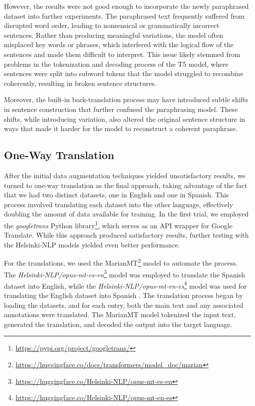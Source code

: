 \documentclass{Configuration_Files/PoliMi3i_thesis}
\begin{document}
However, the results were not good enough to incorporate the newly paraphrased dataset into further experiments. The paraphrased text frequently suffered from disrupted word order, leading to nonsensical or grammatically incorrect sentences. Rather than producing meaningful variations, the model often misplaced key words or phrases, which interfered with the logical flow of the sentences and made them difficult to interpret. This issue likely stemmed from problems in the tokenization and decoding process of the T5 model, where sentences were split into subword tokens that the model struggled to recombine coherently, resulting in broken sentence structures.

Moreover, the built-in back-translation process may have introduced subtle shifts in sentence construction that further confused the paraphrasing model. These shifts, while introducing variation, also altered the original sentence structure in ways that made it harder for the model to reconstruct a coherent paraphrase.

\subsection{One-Way Translation} \label{subsec:translation_T1}
After the initial data augmentation techniques yielded unsatisfactory results, we turned to one-way translation as the final approach, taking advantage of the fact that we had two distinct datasets, one in English and one in Spanish. This process involved translating each dataset into the other language, effectively doubling the amount of data available for training. In the first trial, we employed the \textit{googletrans} Python library\footnote{\url{https://pypi.org/project/googletrans/}}, which serves as an API wrapper for Google Translate. While this approach produced satisfactory results, further testing with the Helsinki-NLP models yielded even better performance.

For the translations, we used the MarianMT\footnote{\url{https://huggingface.co/docs/transformers/model_doc/marian}} model to automate the process. The \textit{Helsinki-NLP/opus-mt-es-en}\footnote{\url{https://huggingface.co/Helsinki-NLP/opus-mt-es-en}} model was employed to translate the Spanish dataset into English, while the \textit{Helsinki-NLP/opus-mt-en-es}\footnote{\url{https://huggingface.co/Helsinki-NLP/opus-mt-en-es}} model was used for translating the English dataset into Spanish \cite{tiedemann2020opus}. The translation process began by loading the datasets, and for each entry, both the main text and any associated annotations were translated. The MarianMT model tokenized the input text, generated the translation, and decoded the output into the target language.
\end{document}
